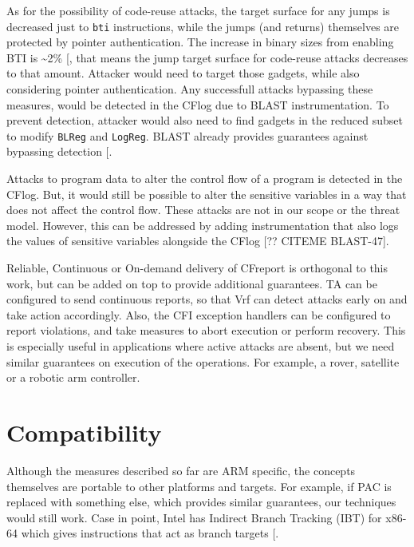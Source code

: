 \documentclass[a4paper, nobind]{templates/ociamthesis}
\begin{document}
As for the possibility of code-reuse attacks, the target surface for any jumps is
decreased just to \texttt{bti} instructions, while the jumps (and returns) themselves are
protected by pointer authentication. The increase in binary sizes from enabling BTI is \textasciitilde2\% {[}\citeproc{ref-arm-pacbti}{5}{]},
that means the jump target surface for code-reuse attacks decreases to that amount.
Attacker would need to target those gadgets, while also considering
pointer authentication. Any successfull attacks bypassing these measures, would
be detected in the CFlog due to BLAST instrumentation. To prevent detection,
attacker would also need to find gadgets in the reduced subset to modify \texttt{BLReg} and \texttt{LogReg}.
BLAST already provides guarantees against bypassing detection {[}\citeproc{ref-blast}{26}{]}.

Attacks to program data to alter the control flow of a program is detected in the CFlog.
But, it would still be possible to alter the sensitive variables in a way that
does not affect the control flow. These attacks are not in our scope or the threat model.
However, this can be addressed by adding instrumentation that also logs the values
of sensitive variables alongside the CFlog {[}?? CITEME BLAST-47{]}.

Reliable, Continuous or On-demand delivery of CFreport is orthogonal to this work, but can
be added on top to provide additional guarantees. TA can be configured to send
continuous reports, so that Vrf can detect attacks early on and take action accordingly.
Also, the CFI exception handlers can be configured to report violations, and take
measures to abort execution or perform recovery. This is especially useful
in applications where active attacks are absent, but we need similar guarantees on
execution of the operations. For example, a rover, satellite or a robotic arm controller.

\section{Compatibility}\label{compatibility}

Although the measures described so far are ARM specific, the concepts themselves
are portable to other platforms and targets.
For example, if PAC is replaced with something else, which provides similar
guarantees, our techniques would still work. Case in point, Intel has Indirect
Branch Tracking (IBT) for x86-64 which gives instructions that act as branch targets {[}\citeproc{ref-intel-ibt}{15}{]}.
\end{document}

